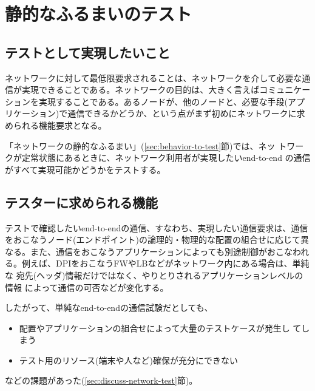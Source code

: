 
 \section{静的なふるまいのテスト}

  \subsection{テストとして実現したいこと}
ネットワークに対して最低限要求されることは、ネットワークを介して必要な通
信が実現できることである。ネットワークの目的は、大きく言えばコミュニケー
ションを実現することである。あるノードが、他のノードと、必要な手段(アプ
リケーション)で通信できるかどうか、という点がまず初めにネットワークに求
められる機能要求となる。

「ネットワークの静的なふるまい」(\ref{sec:behavior-to-test}節)では、ネッ
トワークが定常状態にあるときに、ネットワーク利用者が実現したいend-to-end
の通信がすべて実現可能かどうかをテストする。

  \subsection{テスターに求められる機能}

テストで確認したいend-to-endの通信、すなわち、実現したい通信要求は、通信
をおこなうノード(エンドポイント)の論理的・物理的な配置の組合せに応じて異
なる。また、通信をおこなうアプリケーションによっても別途制御がおこなわれ
る。例えば、DPIをおこなうFWやLBなどがネットワーク内にある場合は、単純な
宛先(ヘッダ)情報だけではなく、やりとりされるアプリケーションレベルの情報
によって通信の可否などが変化する。

したがって、単純なend-to-endの通信試験だとしても、
\begin{itemize}
 \item 配置やアプリケーションの組合せによって大量のテストケースが発生し
       てしまう
 \item テスト用のリソース(端末や人など)確保が充分にできない
\end{itemize}
などの課題があった(\ref{sec:discuss-network-test}節)。

